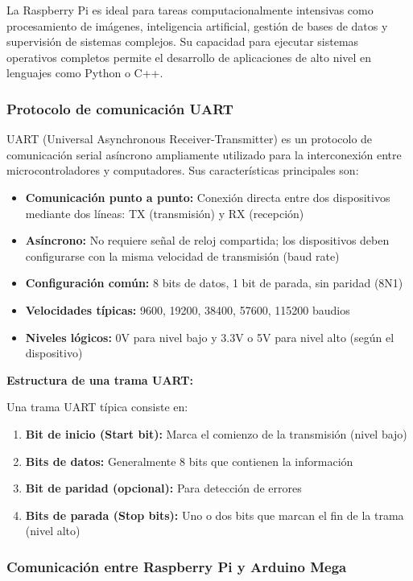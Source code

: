 La Raspberry Pi es ideal para tareas computacionalmente intensivas como procesamiento de imágenes, inteligencia artificial, gestión de bases de datos y supervisión de sistemas complejos. Su capacidad para ejecutar sistemas operativos completos permite el desarrollo de aplicaciones de alto nivel en lenguajes como Python o C++.

\subsubsection{Protocolo de comunicación UART}

UART (Universal Asynchronous Receiver-Transmitter) es un protocolo de comunicación serial asíncrono ampliamente utilizado para la interconexión entre microcontroladores y computadores. Sus características principales son:

\begin{itemize}
    \item \textbf{Comunicación punto a punto:} Conexión directa entre dos dispositivos mediante dos líneas: TX (transmisión) y RX (recepción)
    \item \textbf{Asíncrono:} No requiere señal de reloj compartida; los dispositivos deben configurarse con la misma velocidad de transmisión (baud rate)
    \item \textbf{Configuración común:} 8 bits de datos, 1 bit de parada, sin paridad (8N1)
    \item \textbf{Velocidades típicas:} 9600, 19200, 38400, 57600, 115200 baudios
    \item \textbf{Niveles lógicos:} 0V para nivel bajo y 3.3V o 5V para nivel alto (según el dispositivo)
\end{itemize}

\textbf{Estructura de una trama UART:}

Una trama UART típica consiste en:
\begin{enumerate}
    \item \textbf{Bit de inicio (Start bit):} Marca el comienzo de la transmisión (nivel bajo)
    \item \textbf{Bits de datos:} Generalmente 8 bits que contienen la información
    \item \textbf{Bit de paridad (opcional):} Para detección de errores
    \item \textbf{Bits de parada (Stop bits):} Uno o dos bits que marcan el fin de la trama (nivel alto)
\end{enumerate}

\subsubsection{Comunicación entre Raspberry Pi y Arduino Mega}


